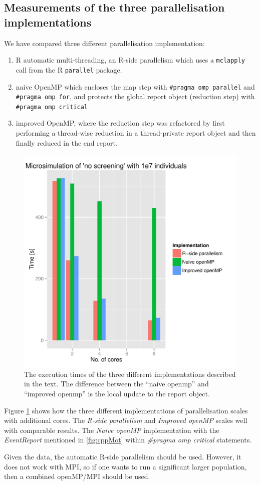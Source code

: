 \subsection{Measurements of the three parallelisation implementations}

We have compared three different parallelisation implementation: 
\begin{enumerate}
\item R automatic multi-threading, an R-side parallelism which uses a
  \texttt{mclapply} call from the R \texttt{parallel} package.
\item naive OpenMP which encloses the map step with \texttt{\#pragma
    omp parallel} and \texttt{\#pragma omp for}, and protects the
  global report object (reduction step) with \texttt{\#pragma omp
    critical}
\item improved OpenMP, where the reduction step was refactored by
  first performing a thread-wise reduction in a thread-private report
  object and then finally reduced in the end report.
\end{enumerate}
\begin{figure}[!htbp] \centering
  \includegraphics[height=0.5\textheight]{images/implementationProfiling.pdf}
  \caption{The execution times of the three different implementations
    described in the text. The difference between the ``naive openmp''
  and ``improved openmp'' is the local update to the report
  object.}
  \label{fig:implScaling}
\end{figure} 
Figure \ref{fig:implScaling} shows how the three
different implementations of parallelisation scales with additional
cores. The \emph{R-side parallelism} and \emph{Improved openMP} scales
well with comparable results. The \emph{Naive openMP} implementation
with the \emph{EventReport} mentioned in \ref{fig:cppMot} within
\emph{\#pragma omp critical} statements. 

Given the data, the automatic R-side parallelism should be
used. However, it does not work with MPI, so if one wants to run a
significant larger population, then a combined openMP/MPI should be
used. 

